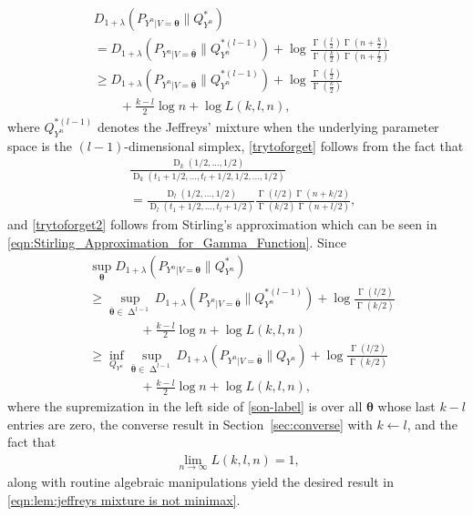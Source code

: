 \documentclass[journal, 10pt]{IEEEtran}
\theoremstyle{plain}
\theoremstyle{plain}
\theoremstyle{plain}
\theoremstyle{plain}
\newcommand{\boldtheta}{\mathbold{\theta}}
\newcommand{\opD}{\operatorname{D}}
\newcommand{\opGamma}{\operatorname{\Gamma}}
\newcommand{\simplex}{\operatorname{\Delta}}
\begin{document}
\begin{appendices}
\begin{IEEEproof}
\begin{align}
&D_{1+\lambda}(P_{Y^n|V=\boldtheta} \| Q_{Y^n}^\ast )\nonumber \\ &= D_{1+\lambda}(P_{Y^n|V=\bar{\boldtheta}} \| Q_{Y^n}^{\ast(l-1)} )  +\log \frac{\opGamma(\frac l2)\opGamma(n+\frac k2) }{\opGamma(\frac k2) \opGamma(n+\frac l2)} \label{trytoforget} \\ 
&\ge 
D_{1+\lambda}(P_{Y^n|V=\bar{\boldtheta}} \| Q_{Y^n}^{\ast(l-1)} ) +\log \frac{\opGamma(\frac{l}{2})}{\opGamma(\frac{k}{2})} \label{trytoforget2}\\ 
&\qquad +\frac{k-l}{2}\log n + \log L(k, l, n)  \text{,} \nonumber
\end{align}
where $Q_{Y^n}^{\ast(l-1)}$ denotes the Jeffreys' mixture when the underlying parameter space is the $(l-1)$-dimensional simplex, \eqref{trytoforget} follows from the fact that
\begin{align}
&\frac{\opD_k(1/2, \hdots, 1/2) }{\opD_k(t_1+1/2, \hdots, t_l+1/2, 1/2, \hdots, 1/2) } \nonumber \\ 
&= \frac{\opD_l(1/2, \hdots, 1/2)}{\opD_l(t_1+1/2, \hdots, t_l+1/2 ) }\frac{\opGamma \left( l/2 \right) \opGamma(n+k/2)}{\opGamma \left(k/2\right) \opGamma\left(n+l/2 \right) }\text{,}
\end{align}
and \eqref{trytoforget2} follows from Stirling's approximation which can be seen in \eqref{eqn:Stirling_Approximation_for_Gamma_Function}. Since
\begin{align}
&\sup_{\boldtheta } D_{1+\lambda}(P_{Y^n|V=\boldtheta} \| Q_{Y^n}^\ast ) \nonumber \\ 
&\ge \sup_{\bar{\boldtheta}\in \simplex^{l-1} } D_{1+\lambda}(P_{Y^n|V=\bar{\boldtheta}} \| Q_{Y^n}^{\ast(l-1) } ) +\log \frac{\opGamma(l/2) }{\opGamma(k/2)}   \\ \nonumber 
&\qquad \qquad +\frac{k-l}{2}\log n + \log L(k, l, n) \label{son-label} \\ 
&\ge \inf_{Q_{Y^n}} \sup_{\bar{\boldtheta}\in \simplex^{l-1} }  D_{1+\lambda}(P_{Y^n|V=\bar{\boldtheta}} \| Q_{Y^n} ) +\log \frac{\opGamma(l/2) }{\opGamma(k/2)} \\ \nonumber 
&\qquad \qquad  +\frac{k-l}{2}\log n + \log L(k, l, n)\text{,}
\end{align}
where the supremization in the left side of \eqref{son-label} is over all $\boldtheta$ whose last $k-l$ entries are zero, the converse result in Section~\ref{sec:converse} with $k\leftarrow l$, and the fact that 
\begin{align}
	\lim_{n \to \infty} L(k,l,n) =1\text{,}
\end{align}
along with routine algebraic manipulations yield the desired result in \eqref{eqn:lem:jeffreys mixture is not minimax}.
\end{IEEEproof}


\end{appendices}
\end{document}

